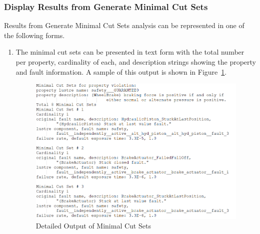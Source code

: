 \subsubsection{Display Results from Generate Minimal Cut Sets}
Results from Generate Minimal Cut Sets analysis can be represented in one of the following forms. 
\begin{enumerate}
\item The minimal cut sets can be presented in text form with the total number per property, cardinality of each, and description strings showing the property and fault information. A sample of this output is shown in Figure~\ref{fig:detailedMCS}. 
\begin{figure}[htbp]
	\hspace*{-2cm}
	\vspace{-0.1in} 
	\begin{center}
		\includegraphics[scale=0.7]{images/wbsMCSDesc.png}
	\caption{Detailed Output of Minimal Cut Sets}
		\label{fig:detailedMCS}
	\end{center}
\end{figure}


\end{enumerate}
